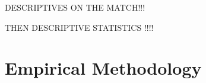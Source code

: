 \documentclass[12pt]{article}
\begin{document}



DESCRIPTIVES ON THE MATCH!!! 







THEN  DESCRIPTIVE STATISTICS !!!!






\section{Empirical Methodology}\label{section:methodology}
\end{document}

